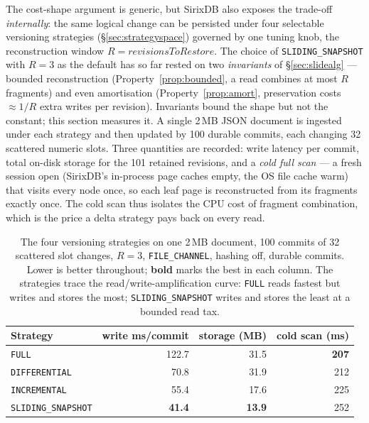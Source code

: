 \documentclass[11pt,a4paper,oneside]{report}
\theoremstyle{sirixthm}
\newcommand{\code}[1]{\texttt{#1}}
\begin{document}
The cost-shape argument is generic, but SirixDB also exposes the trade-off \emph{internally}: the same
logical change can be persisted under four selectable versioning strategies
(\S\ref{sec:strategyspace}) governed by one tuning knob, the reconstruction window
$R=\textit{revisionsToRestore}$. The choice of \code{SLIDING\_SNAPSHOT} with $R=3$ as the default has so
far rested on two \emph{invariants} of \S\ref{sec:slidealg} --- bounded reconstruction
(Property~\ref{prop:bounded}, a read combines at most $R$ fragments) and even amortisation
(Property~\ref{prop:amort}, preservation costs $\approx 1/R$ extra writes per revision). Invariants bound
the shape but not the constant; this section measures it. A single 2\,MB JSON document is ingested under
each strategy and then updated by 100 durable commits, each changing 32 scattered numeric slots. Three
quantities are recorded: write latency per commit, total on-disk storage for the 101 retained revisions,
and a \emph{cold full scan} --- a fresh session open (SirixDB's in-process page caches empty, the OS file
cache warm) that visits every node once, so each leaf page is reconstructed from its fragments exactly
once. The cold scan thus isolates the CPU cost of fragment combination, which is the price a delta
strategy pays back on every read.

\begin{table}[h]
\centering\footnotesize\setlength{\tabcolsep}{7pt}\renewcommand{\arraystretch}{1.25}
\begin{tabular}{@{}l r r r@{}}
\toprule
\textbf{Strategy} & \textbf{write ms/commit} & \textbf{storage (MB)} & \textbf{cold scan (ms)}\\
\midrule
\code{FULL}             & 122.7 & 31.5 & \textbf{207}\\
\code{DIFFERENTIAL}     & 70.8  & 31.9 & 212\\
\code{INCREMENTAL}      & 55.4  & 17.6 & 225\\
\code{SLIDING\_SNAPSHOT} & \textbf{41.4} & \textbf{13.9} & 252\\
\bottomrule
\end{tabular}
\caption{The four versioning strategies on one 2\,MB document, 100 commits of 32 scattered slot
changes, $R=3$, \code{FILE\_CHANNEL}, hashing off, durable commits. Lower is better throughout;
\textbf{bold} marks the best in each column. The strategies trace the read/write-amplification curve:
\code{FULL} reads fastest but writes and stores the most; \code{SLIDING\_SNAPSHOT} writes and stores the
least at a bounded read tax.}
\label{tab:versioning-strategies}
\end{table}
\end{document}
